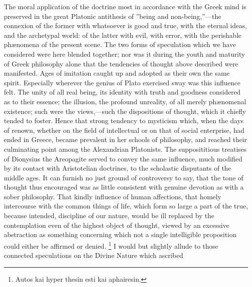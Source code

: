 \documentclass[oneside]{book}
\begin{document}
The moral application of the doctrine most in
accordance with the Greek mind is preserved in the great Platonic
antithesis of ''being and non-being,''---the connexion of the
former with whatsoever is good and true, with the eternal ideas,
and the archetypal world: of the latter with evil, with error,
with the perishable ph\ae nomena of the present scene. The two
forms of speculation which we have considered were here blended
together; nor was it during the youth and maturity of Greek
philosophy alone that the tendencies of thought above described
were manifested. Ages of imitation caught up and adopted as
their own the same spirit. Especially wherever the genius of
Plato exercised sway was this influence felt. The unity of all
real being, its identity with truth and goodness considered
as to their essence; the illusion, the profound unreality, of all
merely ph\ae nomenal existence; such were the views,---such the
dispositions of thought, which it chiefly tended to foster. Hence
that strong tendency to mysticism which, when the days of renown,
whether on the field of intellectual or on that of social enterprise,
had ended in Greece, became prevalent in her schools
of philosophy, and reached their culminating point among the
Alexandrian Platonists. The supposititious treatises of Dionysius
the Areopagite served to convey the same influence, much modified
by its contact with Aristotelian doctrines, to the scholastic
disputants of the middle ages. It can furnish no just ground of
controversy to say, that the tone of thought thus encouraged was
as little consistent with genuine devotion as with a sober philosophy.
That kindly influence of human affections, that homely
intercourse with the common things of life, which form so large
a part of the true, because intended, discipline of our nature,
would be ill replaced by the contemplation even of the highest
object of thought, viewed by an excessive abstraction as something
concerning which not a single intelligible proposition could
either be affirmed or denied.%
\footnote{%
\textgreek{Autos kai hyper thesin esti kai aphairesin.}
}%
 I would but slightly allude to
those connected speculations on the Divine Nature which ascribed
\end{document}
